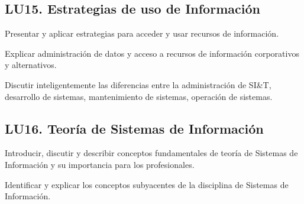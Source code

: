 \subsection{LU15. Estrategias de uso de Información}\label{sec:BOK-LU15}\label{sec:LU15}
\begin{LearningUnit}
\begin{LUGoal}
\item Presentar y aplicar estrategias para acceder y usar recursos de información.
\end{LUGoal}

\begin{LUObjective}
\item Explicar administración de datos y acceso a recursos de información corporativos y alternativos.
\item Discutir inteligentemente las diferencias entre la administración de SI\&T, desarrollo de sistemas, mantenimiento de sistemas, operación de sistemas.
\end{LUObjective}
\end{LearningUnit}

\subsection{LU16. Teoría de Sistemas de Información}\label{sec:BOK-LU16}\label{sec:LU16}
\begin{LearningUnit}
\begin{LUGoal}
\item Introducir, discutir y describir conceptos fundamentales de teoría de Sistemas de Información y su importancia para los profesionales.
\end{LUGoal}

\begin{LUObjective}
\item Identificar y explicar los conceptos subyacentes de la disciplina de Sistemas de Información.
\end{LUObjective}
\end{LearningUnit}

